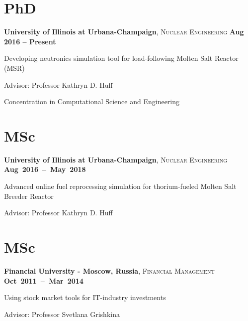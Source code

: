 \documentclass[margin,line]{resume}
\begin{document}
\begin{resume}
    \section{\mysidestyle PhD}
    \textbf{University of Illinois at Urbana-Champaign}, \textsc{Nuclear Engineering}\hfill \textbf{ Aug 2016 -- Present}\vspace{-3mm}\\\vspace{-1mm}%
    \begin{list2}
        \item Developing neutronics simulation tool for load-following Molten 
        Salt Reactor (MSR)
        \item Advisor:  Professor Kathryn D. Huff
        \item Concentration in Computational Science and Engineering
    \end{list2}\vspace{-1.5mm}
    \section{\mysidestyle MSc}
    \textbf{University of Illinois at Urbana-Champaign}, \textsc{Nuclear Engineering} \hfill\textbf{\mbox{Aug 2016 -- May 2018}}\vspace{-3mm}\\\vspace{-1mm}%
    \begin{list2}
        \item Advanced online fuel reprocessing simulation for thorium-fueled Molten Salt Breeder Reactor
        \item Advisor:  Professor Kathryn D. Huff
    \end{list2}\vspace{-1.5mm}
    \section{\mysidestyle MSc}
    \textbf{Financial University - Moscow, Russia}, \textsc{Financial Management} \hfill \textbf{\mbox{Oct 2011 -- Mar 2014	}}\vspace{-3mm}\\\vspace{-1mm}%
    \begin{list2}
        \item Using stock market tools for IT-industry investments
        \item Advisor:  Professor Svetlana Grishkina
    \end{list2}\vspace{-1.5mm}

\end{resume}
\end{document}
